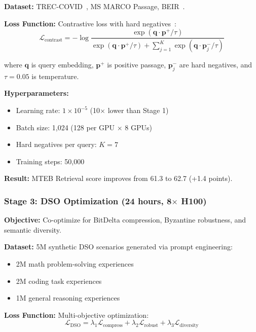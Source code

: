 \textbf{Dataset:} TREC-COVID~\cite{voorhees2020trec}, MS MARCO Passage, BEIR~\cite{thakur2021beir}.

\textbf{Loss Function:} Contrastive loss with hard negatives~\cite{karpukhin2020dpr}:
\begin{equation}
\mathcal{L}_{\text{contrast}} = -\log \frac{\exp(\mathbf{q} \cdot \mathbf{p}^+ / \tau)}{\exp(\mathbf{q} \cdot \mathbf{p}^+ / \tau) + \sum_{j=1}^{K} \exp(\mathbf{q} \cdot \mathbf{p}_j^- / \tau)}
\end{equation}

where $\mathbf{q}$ is query embedding, $\mathbf{p}^+$ is positive passage, $\mathbf{p}_j^-$ are hard negatives, and $\tau=0.05$ is temperature.

\textbf{Hyperparameters:}
\begin{itemize}
\item Learning rate: $1 \times 10^{-5}$ (10$\times$ lower than Stage 1)
\item Batch size: 1,024 (128 per GPU $\times$ 8 GPUs)
\item Hard negatives per query: $K=7$
\item Training steps: 50,000
\end{itemize}

\textbf{Result:} MTEB Retrieval score improves from 61.3 to 62.7 (+1.4 points).

\subsubsection{Stage 3: DSO Optimization (24 hours, 8$\times$ H100)}

\textbf{Objective:} Co-optimize for BitDelta compression, Byzantine robustness, and semantic diversity.

\textbf{Dataset:} 5M synthetic DSO scenarios generated via prompt engineering:
\begin{itemize}
\item 2M math problem-solving experiences
\item 2M coding task experiences  
\item 1M general reasoning experiences
\end{itemize}

\textbf{Loss Function:} Multi-objective optimization:
\begin{equation}
\mathcal{L}_{\text{DSO}} = \lambda_1 \mathcal{L}_{\text{compress}} + \lambda_2 \mathcal{L}_{\text{robust}} + \lambda_3 \mathcal{L}_{\text{diversity}}
\end{equation}

